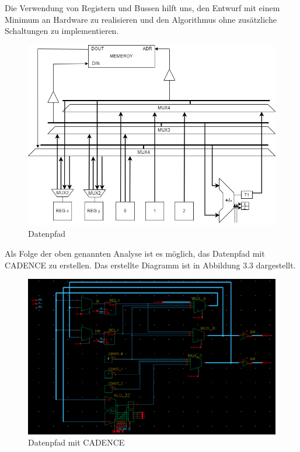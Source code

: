 \vspace{\baselineskip}

\noindent Die Verwendung von Registern und Bussen hilft uns, den Entwurf mit einem Minimum an Hardware zu realisieren und den Algorithmus ohne zusätzliche Schaltungen zu implementieren.

\vspace{\baselineskip}
\begin{figure}[H]
  \centering
  \includegraphics[width=1.0\textwidth]{images/Datenpfad.png}
  \caption[Datenpfad]{Datenpfad}
  \label{fig:datenpfad}
\end{figure}

\noindent Als Folge der oben genannten Analyse ist es möglich, das Datenpfad mit CADENCE zu erstellen. Das erstellte Diagramm ist in Abbildung 3.3 dargestellt.

\vspace{\baselineskip}

\begin{figure}[H]
  \centering
  \includegraphics[width=1.0\textwidth]{images/DatapfadCADENCE.png}
  \caption[Datenpfad mit CADENCE]{Datenpfad mit CADENCE}
  \label{fig:datapfadCADENCE}
\end{figure}

